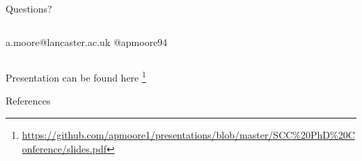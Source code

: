 \documentclass[10pt]{beamer}
\begin{document}
%
%




\begin{frame}[plain]
\begin{center}
\begin{center}
\huge Questions?
\end{center}
\begin{center}
\begin{columns}[T,onlytextwidth]
\centering
\normalsize a.moore@lancaster.ac.uk
\centering
\normalsize @apmoore94
\end{columns}
\end{center}
\end{center}

\begin{center}
\begin{center}
\small Presentation can be found here \footnote{\url{https://github.com/apmoore1/presentations/blob/master/SCC\%20PhD\%20Conference/slides.pdf}}
\end{center}
\end{center}

\end{frame}


\appendix
\begin{frame}{References}
  \printbibliography[heading=none]
\end{frame}
\end{document}
